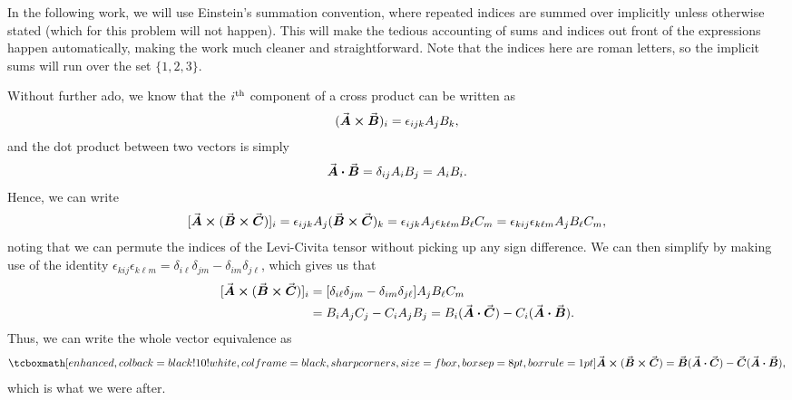 \def\duedate{09/16/22}
\def\HWnum{}



    

In the following work, we will use Einstein's summation convention, where repeated indices are summed over implicitly unless otherwise stated (which for this problem will not happen).
This will make the tedious accounting of sums and indices out front of the expressions happen automatically, making the work much cleaner and straightforward.
Note that the indices here are roman letters, so the implicit sums will run over the set $\{ 1,2,3 \} $.

Without further ado, we know that the $i^{\rm th}$ component of a cross product can be written as
\begin{eqnarray}
    \label{eq:cross-product}
    (\va*{A} \cross \va*{B})_{i} = \epsilon_{ijk} A_{j}B_{k}
,\end{eqnarray}
and the dot product between two vectors is simply
\begin{eqnarray}
    \label{eq:dot-product}
    \va*{A} \vdot \va*{B} = \delta_{ij}A_{i}B_{j} = A_{i}B_{i}
.\end{eqnarray}
Hence, we can write
\begin{eqnarray}
    \label{eq:A-x-BxC}
    [\va*{A} \cross (\va*{B} \cross \va*{C})]_{i} = \epsilon_{ijk} A_{j}(\va*{B} \cross \va*{C})_{k} = \epsilon_{ijk} A_{j} \epsilon_{k \ell m} B_{\ell} C_{m} = \epsilon_{kij}\epsilon_{k \ell m} A_{j} B_{\ell} C_{m}
,\end{eqnarray}
noting that we can permute the indices of the Levi-Civita tensor without picking up any sign difference.
We can then simplify  by making use of the identity $\epsilon_{kij}\epsilon_{k \ell m} = \delta_{i \ell} \delta_{jm} - \delta_{im}\delta_{j\ell}$, which gives us that
\begin{align}
    \label{eq:simplified-cross}
    [\va*{A} \cross (\va*{B} \cross \va*{C})]_{i} &= [\delta_{i\ell}\delta_{jm} - \delta_{im}\delta_{j\ell}]A_{j}B_{\ell}C_{m} \notag \\
    &= B_{i}A_{j}C_{j} - C_{i}A_{j}B_{j} = B_{i}(\va*{A} \vdot \va*{C}) - C_{i}(\va*{A} \vdot \va*{B})
.\end{align}
Thus, we can write the whole vector equivalence as
\begin{eqnarray}
    \label{eq:result}
    \eqbox{
        \va*{A} \cross (\va*{B} \cross \va*{C}) = \va*{B}(\va*{A} \vdot \va*{C}) - \va*{C}(\va*{A} \vdot \va*{B})
    }
,\end{eqnarray}
which is what we were after.



